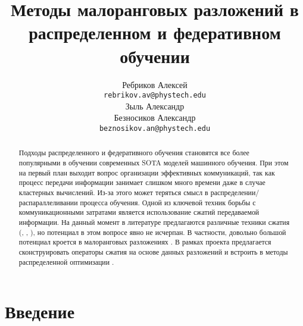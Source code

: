 \documentclass{article}
\title{Методы малоранговых разложений в распределенном и федеративном обучении}
\author{ Ребриков Алексей \\
	\texttt{rebrikov.av@phystech.edu} \\
	\And
	Зыль Александр\\
	\And 
	Безносиков Александр\\
	\texttt{beznosikov.an@phystech.edu} \\
}
\date{}
\begin{document}
\maketitle

\begin{abstract}
	Подходы распределенного и федеративного обучения становятся все более популярными в обучении современных SOTA моделей машинного обучения. При этом на первый план выходит вопрос организации эффективных коммуникаций, так как процесс передачи информации занимает слишком много времени даже в случае кластерных вычислений. Из-за этого может теряться смысл в распределении/распараллеливании процесса обучения. Одной из ключевой техник  борьбы с коммуникационными затратами является использование сжатий передаваемой информации. На данный момент в литературе предлагаются различные техники сжатия (\citep{beznosikov2023biased}, \citep{alistarh2017qsgd}, \citep{horvoth2022natural}), но потенциал в этом вопросе явно не исчерпан. В частности, довольно большой потенциал кроется в малоранговых разложениях \citep{Gundersen2019RSVD}. В рамках проекта предлагается сконструировать операторы сжатия на основе данных разложений и встроить в методы распределенной оптимизации \citep{richtarik2021ef21}.
\end{abstract}



\section{Введение}



\end{document}
